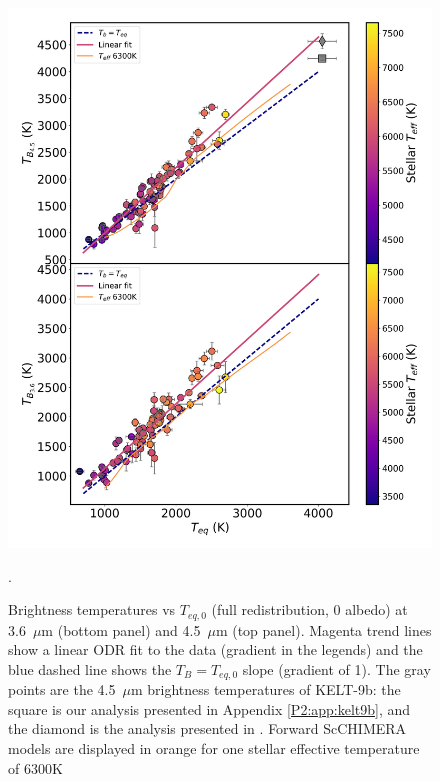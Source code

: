 \begin{figure}
    \centering
    \includegraphics[trim={0cm 0cm 0cm 0cm},clip,width=\linewidth]{TeqvsTb_PHOENIX_intplwitoutliers.pdf}
    \caption{Brightness temperatures vs $T_{eq,\textit{0}}$ (full redistribution, 0 albedo) at 3.6~$\mu$m (bottom panel) and 4.5~$\mu$m (top panel). Magenta trend lines show a linear ODR fit to the data (gradient in the legends) and the blue dashed line shows the $T_B = T_{eq,\textit{0}}$ slope (gradient of 1). The gray points are the 4.5~$\mu$m brightness temperatures of KELT-9b: the square is our analysis presented in Appendix \ref{P2:app:kelt9b}, and the diamond is the analysis presented in \citet{Mansfield2020}. Forward ScCHIMERA models are displayed in orange for one stellar effective temperature of 6300K}.
    \label{P2:fig:Tbs}
\end{figure}

